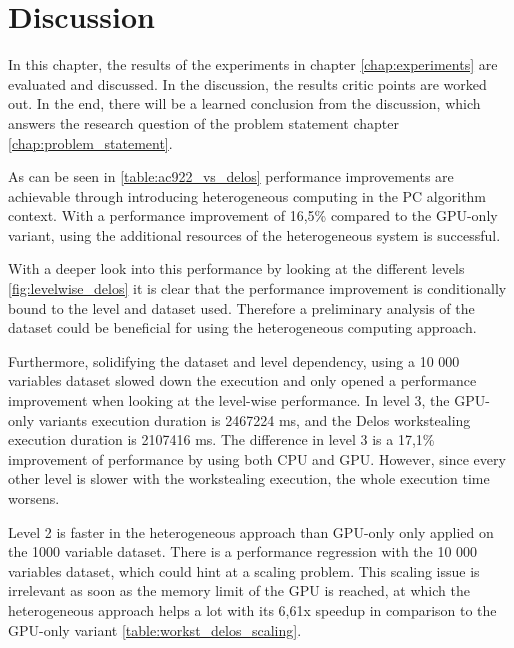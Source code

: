\chapter{Discussion}
In this chapter, the results of the experiments in chapter \ref{chap:experiments} are evaluated and discussed. In the discussion, the results critic points are worked out. In the end, there will be a learned conclusion from the discussion, which answers the research question of the problem statement chapter \ref{chap:problem_statement}.

% 
As can be seen in \ref{table:ac922_vs_delos} performance improvements are achievable through introducing heterogeneous computing in the PC algorithm context. With a performance improvement of 16,5\% compared to the GPU-only variant, using the additional resources of the heterogeneous system is successful.

With a deeper look into this performance by looking at the different levels \ref{fig:levelwise_delos} it is clear that the performance improvement is conditionally bound to the level and dataset used. Therefore a preliminary analysis of the dataset could be beneficial for using the heterogeneous computing approach.

Furthermore, solidifying the dataset and level dependency, using a 10 000 variables dataset slowed down the execution and only opened a performance improvement when looking at the level-wise performance. In level 3, the GPU-only variants execution duration is 2467224 ms, and the Delos workstealing execution duration is 2107416 ms.
The difference in level 3 is a 17,1\% improvement of performance by using both CPU and GPU. However, since every other level is slower with the workstealing execution, the whole execution time worsens.

Level 2 is faster in the heterogeneous approach than GPU-only only applied on the 1000 variable dataset. There is a performance regression with the 10 000 variables dataset, which could hint at a scaling problem.
This scaling issue is irrelevant as soon as the memory limit of the GPU is reached, at which the heterogeneous approach helps a lot with its 6,61x speedup in comparison to the GPU-only variant \ref{table:workst_delos_scaling}.


